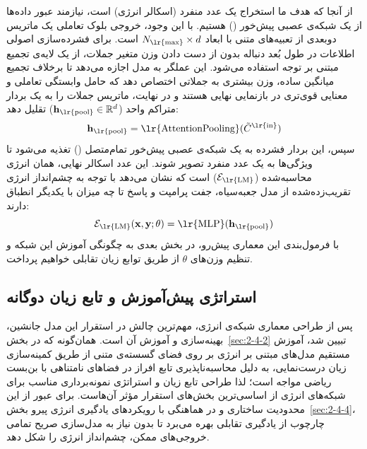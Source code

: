 از آنجا که هدف ما استخراج یک عدد منفرد (اسکالر انرژی) است، نیازمند عبور داده‌ها از یک شبکه‌ی عصبی پیش‌خور () هستیم. با این وجود، خروجی بلوک تعاملی یک ماتریس دوبعدی از تعبیه‌های متنی با ابعاد $N_{\text{\lr{max}}} \times d$ است. برای فشرده‌سازی اصولی اطلاعات در طول بُعد دنباله بدون از دست دادن وزن متغیر جملات، از یک لایه‌ی تجمیع مبتنی بر توجه استفاده می‌شود. این عملگر به مدل اجازه می‌دهد تا برخلاف تجمیع میانگین ساده، وزن بیشتری به جملاتی اختصاص دهد که حامل وابستگی تعاملی و معنایی قوی‌تری در بازنمایی نهایی هستند و در نهایت، ماتریس جملات را به یک بردار متراکم واحد ($\mathbf{h}_{\text{\lr{pool}}} \in \mathbb{R}^d$) تقلیل دهد:
\begin{equation}\label{eq:chap4_attention_pooling}
    \mathbf{h}_{\text{\lr{pool}}} = \text{\lr{AttentionPooling}}(\tilde{C}^{\text{\lr{in}}})
\end{equation}
سپس، این بردار فشرده به یک شبکه‌ی عصبی پیش‌خور تمام‌متصل () تغذیه می‌شود تا ویژگی‌ها به یک عدد منفرد تصویر شوند. این عدد اسکالر نهایی، همان انرژی محاسبه‌شده ($\mathcal{E}_{\text{\lr{LM}}}$) است که نشان می‌دهد با توجه به چشم‌انداز انرژی تقریب‌زده‌شده از مدل جعبه‌سیاه، جفت پرامپت و پاسخ تا چه میزان با یکدیگر انطباق دارند:
\begin{equation}\label{eq:chap4_energy_calc}
    \mathcal{E}_{\text{\lr{LM}}}(\mathbf{x}, \mathbf{y}; \theta) = \text{\lr{MLP}}(\mathbf{h}_{\text{\lr{pool}}})
\end{equation}
با فرمول‌بندی این معماری پیش‌رو، در بخش بعدی به چگونگی آموزش این شبکه و تنظیم وزن‌های $\theta$ از طریق توابع زیان تقابلی خواهیم پرداخت.


\subsection{استراتژی پیش‌آموزش و تابع زیان دوگانه}\label{sec:4-3-2}

پس از طراحی معماری شبکه‌ی انرژی، مهم‌ترین چالش در استقرار این مدل جانشین، بهینه‌سازی و آموزش آن است. همان‌گونه که در بخش~\ref{sec:2-4-2} تبیین شد، آموزش مستقیم مدل‌های مبتنی بر انرژی بر روی فضای گسسته‌ی متنی از طریق کمینه‌سازی زیان درست‌نمایی، به دلیل محاسبه‌ناپذیری تابع افراز در فضاهای نامتناهی با بن‌بست ریاضی مواجه است؛ لذا طراحی تابع زیان و استراتژی نمونه‌برداری مناسب برای شبکه‌های انرژی از اساسی‌ترین بخش‌های استقرار مؤثر آن‌هاست. برای عبور از این محدودیت ساختاری و در هماهنگی با رویکردهای یادگیری انرژی پیرو بخش~\ref{sec:2-4-4}، چارچوب  از یادگیری تقابلی بهره می‌برد تا بدون نیاز به مدل‌سازی صریح تمامی خروجی‌های ممکن، چشم‌انداز انرژی را شکل دهد.

